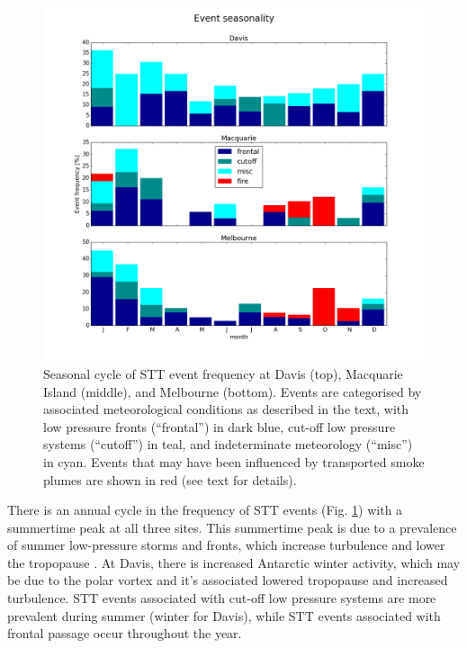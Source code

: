 \documentclass[acp, manuscript]{copernicus} %
\begin{document}
  \begin{figure}[t]
    \includegraphics[width=12cm]{figures/summary_season.png}
    \caption{Seasonal cycle of STT event frequency at Davis (top), Macquarie Island (middle), and Melbourne (bottom).
      Events are categorised by associated meteorological conditions as described in the text, with low pressure fronts (“frontal”) in dark blue, cut-off low pressure systems (“cutoff”) in teal, and indeterminate meteorology (“misc”) in cyan. 
      Events that may have been influenced by transported smoke plumes are shown in red (see text for details).}
    \label{fig:SummarySeasonality}
  \end{figure}
  
  There is an annual cycle in the frequency of STT events  (Fig. \ref{fig:SummarySeasonality}) with a summertime peak at all three sites.
  This summertime peak is due to a prevalence of summer low-pressure storms and fronts, which increase turbulence and lower the tropopause \citep{Reutter2015}.
  At Davis, there is increased Antarctic winter activity, which may be due to the polar vortex and it's associated lowered tropopause and increased turbulence.
  STT events associated with cut-off low pressure systems are more prevalent during summer (winter for Davis), while STT events associated with frontal passage occur throughout the year.
  
\end{document}
